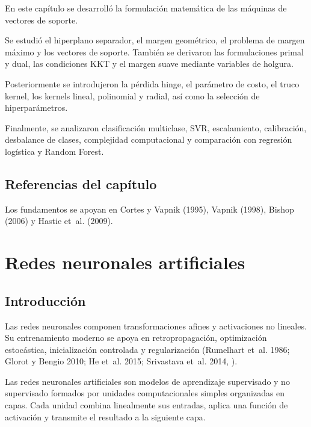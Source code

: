 \documentclass[
  spanish,
  10.5pt,
  letterpaper,
  DIV=11,
  numbers=noendperiod,
  oneside,
  open=any]{scrreprt}
\theoremstyle{definition}
\theoremstyle{definition}
\theoremstyle{plain}
\theoremstyle{remark}
\begin{document}

En este capítulo se desarrolló la formulación matemática de las máquinas
de vectores de soporte.

Se estudió el hiperplano separador, el margen geométrico, el problema de
margen máximo y los vectores de soporte. También se derivaron las
formulaciones primal y dual, las condiciones KKT y el margen suave
mediante variables de holgura.

Posteriormente se introdujeron la pérdida hinge, el parámetro de costo,
el truco kernel, los kernels lineal, polinomial y radial, así como la
selección de hiperparámetros.

Finalmente, se analizaron clasificación multiclase, SVR, escalamiento,
calibración, desbalance de clases, complejidad computacional y
comparación con regresión logística y Random Forest.

\section*{Referencias del
capítulo}\label{referencias-del-capuxedtulo-14}


Los fundamentos se apoyan en Cortes y Vapnik (1995), Vapnik (1998),
Bishop (2006) y Hastie et~al. (2009).

\chapter{\texorpdfstring{Redes neuronales
artificiales}{Redes neuronales artificiales}}\label{sec-redes-neuronales}

\section*{Introducción}\label{introducciuxf3n-16}


Las redes neuronales componen transformaciones afines y activaciones no
lineales. Su entrenamiento moderno se apoya en
retropropagación, optimización estocástica,
inicialización controlada y regularización (Rumelhart et~al. 1986;
Glorot y Bengio 2010; He et~al. 2015; Srivastava et~al. 2014,
).

Las redes neuronales artificiales son modelos de aprendizaje supervisado
y no supervisado formados por unidades computacionales simples
organizadas en capas. Cada unidad combina linealmente sus entradas,
aplica una función de activación y transmite el resultado a la siguiente
capa.
\end{document}
